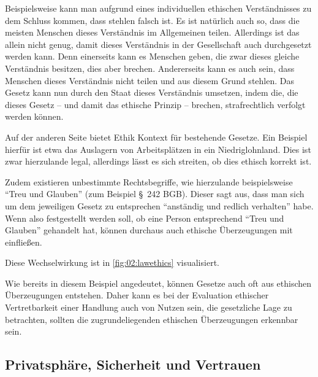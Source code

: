 Beispielsweise kann man aufgrund eines individuellen ethischen Verständnisses zu dem Schluss kommen, dass stehlen falsch ist.
Es ist natürlich auch so, dass die meisten Menschen dieses Verständnis im Allgemeinen teilen.
Allerdings ist das allein nicht genug, damit dieses Verständnis in der Gesellschaft auch durchgesetzt werden kann.
Denn einerseits kann es Menschen geben, die zwar dieses gleiche Verständnis besitzen, dies aber brechen.
Andererseits kann es auch sein, dass Menschen dieses Verständnis nicht teilen und aus diesem Grund stehlen.
Das Gesetz kann nun durch den Staat dieses Verständnis umsetzen, indem die,
die dieses Gesetz -- und damit das ethische Prinzip -- brechen, strafrechtlich verfolgt werden können.

Auf der anderen Seite bietet Ethik Kontext für bestehende Gesetze.
Ein Beispiel hierfür ist etwa das Auslagern von Arbeitsplätzen in ein Niedriglohnland.
Dies ist zwar hierzulande legal, allerdings lässt es sich streiten, ob dies ethisch korrekt ist.

Zudem existieren unbestimmte Rechtsbegriffe, wie hierzulande beispielsweise \enquote{Treu und Glauben} (zum Beispiel §~242 BGB).
Dieser sagt aus, dass man sich um dem jeweiligen Gesetz zu entsprechen \enquote{anständig und redlich verhalten} habe.\cite{alexy_treu_2019}
Wenn also festgestellt werden soll, ob eine Person entsprechend \enquote{Treu und Glauben} gehandelt hat,
können durchaus auch ethische Überzeugungen mit einfließen.

Diese Wechselwirkung ist in \cref{fig:02:lawethics} visualisiert.

Wie bereits in diesem Beispiel angedeutet, können Gesetze auch oft aus ethischen Überzeugungen entstehen.
Daher kann es bei der Evaluation ethischer Vertretbarkeit einer Handlung auch von Nutzen sein,
die gesetzliche Lage zu betrachten, sollten die zugrundeliegenden ethischen Überzeugungen erkennbar sein.

\subsection{Privatsphäre, Sicherheit und Vertrauen}

